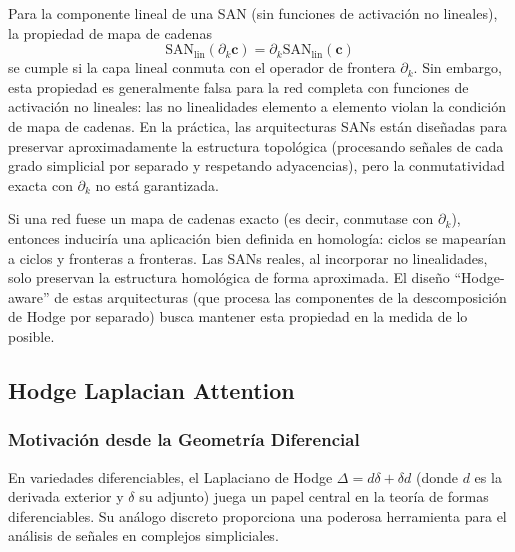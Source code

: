 \begin{remark}\label{rem:respeto_estructura_cadenas}
Para la componente lineal de una SAN (sin funciones de activación no lineales), la propiedad de mapa de cadenas
\begin{equation}
    \text{SAN}_{\text{lin}}(\partial_k \mathbf{c}) = \partial_k \text{SAN}_{\text{lin}}(\mathbf{c})
\end{equation}
se cumple si la capa lineal conmuta con el operador de frontera $\partial_k$. Sin embargo, esta propiedad es generalmente falsa para la red completa con funciones de activación no lineales: las no linealidades elemento a elemento violan la condición de mapa de cadenas. En la práctica, las arquitecturas SANs están diseñadas para preservar aproximadamente la estructura topológica (procesando señales de cada grado simplicial por separado y respetando adyacencias), pero la conmutatividad exacta con $\partial_k$ no está garantizada.
\end{remark}

\begin{remark}\label{cor:preservacion_homologia}
Si una red fuese un mapa de cadenas exacto (es decir, conmutase con $\partial_k$), entonces induciría una aplicación bien definida en homología: ciclos se mapearían a ciclos y fronteras a fronteras. Las SANs reales, al incorporar no linealidades, solo preservan la estructura homológica de forma aproximada. El diseño ``Hodge-aware'' de estas arquitecturas (que procesa las componentes de la descomposición de Hodge por separado) busca mantener esta propiedad en la medida de lo posible.
\end{remark}

\subsection{Hodge Laplacian Attention}

\subsubsection{Motivación desde la Geometría Diferencial}

En variedades diferenciables, el Laplaciano de Hodge $\Delta = d \delta + \delta d$ (donde $d$ es la derivada exterior y $\delta$ su adjunto) juega un papel central en la teoría de formas diferenciables. Su análogo discreto proporciona una poderosa herramienta para el análisis de señales en complejos simpliciales.


